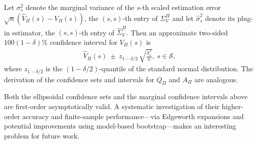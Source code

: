 \documentclass[twoside,11pt]{article}
\numberwithin{equation}{section}
\newcommand{\lp}{\left(}
\newcommand{\rp}{\right)}
\begin{document}
Let $\sigma^{2}_{s}$ denote the marginal variance of the $s$-th scaled estimation error $\sqrt{n}\lp \hat V_\Pi(s) - V_\Pi(s) \rp$, the $(s,s)$-th entry of $\Sigma_V^\Pi$ and let $\hat \sigma^{2}_{s}$ denote its plug-in estimator, the $(s,s)$-th entry of $\hat \Sigma_V^\Pi$.
Then an approximate two-sided $100(1-\delta)\%$ confidence interval for $V_\Pi(s)$ is
\begin{align*}
\hat V_\Pi(s)
\ \pm\
z_{1-\delta/2}\,
\sqrt{\frac{\hat{\sigma}^{2}_{s}}{n}},
\ s \in \mathcal{S},
\end{align*}
where $z_{1-\delta/2}$ is the $(1-\delta/2)$-quantile of the standard normal distribution.
The derivation of the confidence sets and intervals for $Q_\Pi$ and $A_\Pi$ are analogous.

Both the ellipsoidal confidence sets and the marginal confidence intervals above are first-order asymptotically valid. 
A systematic investigation of their higher-order accuracy and finite-sample performance—via Edgeworth expansions and potential improvements using model-based bootstrap—makes an interesting problem for future work.
\end{document}
